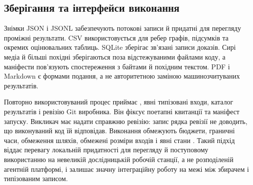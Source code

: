 \subsection{Зберігання та інтерфейси виконання}
Знімки JSON і JSONL забезпечують потокові записи й придатні для перегляду проміжні результати. CSV використовується для ребер графів, підсумків та окремих оцінювальних таблиць. SQLite зберігає зв'язані записи доказів. Сирі медіа й більші похідні зберігаються поза відстежуваними файлами коду, а маніфести пов'язують спостереження з байтами й похідним текстом. PDF і Markdown є формами подання, а не авторитетною заміною машинозчитуваних результатів.

Повторно використовуваний процес приймає , явні типізовані входи, каталог результатів і ревізію Git виробника. Він фіксує поетапні квитанції та маніфест запуску. Викликач має надати справжню ревізію: запис рядка ревізії не доводить, що виконуваний код їй відповідав. Виконання обмежують бюджети, граничні часи, обмеження шляхів, обмежені розміри входів і явні стани . Такий підхід віддає перевагу локальній придатності для перегляду й поступовому використанню на невеликій дослідницькій робочій станції, а не розподіленій агентній платформі, і залишає значну інтеграційну роботу на межі між збирачем і типізованим записом.

